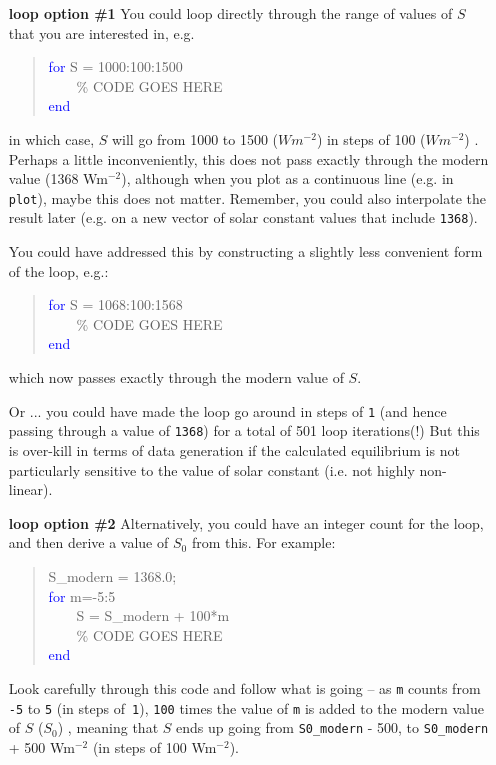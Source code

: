 \documentclass{tufte-book} %
\newenvironment{docspec}{\begin{quotation}\ttfamily\parskip0pt\parindent0pt\ignorespaces}{\end{quotation}}
\begin{document}
\begin{enumerate}
\setlength{\itemindent}{.65in}

\item [\textbf{loop option \#1}] You could loop directly through the range of values of \(S\) that you are interested in, e.g.
\begin{docspec}
\textcolor{blue}{for} S = 1000:100:1500
\\ \ \ \ \ \textcolor[rgb]{0,0.501961,0}{\% CODE GOES HERE}
\\\textcolor{blue}{end}
\end{docspec}
in which case, \(S\) will go from 1000 to 1500 (\(Wm^{-2}\)) in steps of 100 (\(Wm^{-2}\)) .
\\Perhaps a little inconveniently, this does not pass exactly through the modern value (1368 Wm\(^{-2}\)), although when you plot as a continuous line (e.g. in \texttt{plot}),  maybe this does not matter.  Remember, you could also interpolate the result later (e.g. on a new vector of solar constant values that include \texttt{1368}).

You could have addressed this by constructing a slightly less convenient form of the loop, e.g.:
\begin{docspec}
\textcolor{blue}{for} S = 1068:100:1568
\\ \ \ \ \ \textcolor[rgb]{0,0.501961,0}{\% CODE GOES HERE}
\\\textcolor{blue}{end}
\end{docspec}
which now passes exactly through the modern value of \(S\).

Or ... you could have made the loop go around in steps of \texttt{1} (and hence passing through a value of \texttt{1368}) for a total of 501 loop iterations(!) But this is over-kill in terms of data generation if the calculated equilibrium is  not  particularly sensitive to the value of solar constant (i.e. not highly non-linear).

\item [\textbf{loop option \#2}] Alternatively, you could have an integer count for the loop, and then derive a  value of \(S_{0}\) from this. For example:
\begin{docspec}
S\_modern = 1368.0;
\\\textcolor{blue}{for} m=-5:5
\\ \ \ \ \ S = S\_modern + 100*m
\\ \ \ \ \ \textcolor[rgb]{0,0.501961,0}{\% CODE GOES HERE}
\\\textcolor{blue}{end}
\end{docspec}
Look carefully through this code and follow what is going -- as \texttt{m} counts from \texttt{-5} to \texttt{5} (in steps of\texttt{ 1}), \texttt{100} times the value of \texttt{m} is added to the modern value of \(S\) (\(S_{0}\)) , meaning that \(S\) ends up going from \texttt{S0\_modern} - 500, to \texttt{S0\_modern} + 500 Wm\(^{-2}\) (in steps of 100 Wm\(^{-2}\)).


\end{enumerate}
\end{document}
